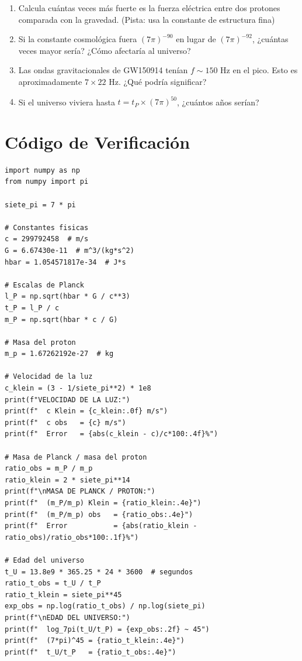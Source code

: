 \begin{enumerate}
    \item Calcula cuántas veces más fuerte es la fuerza eléctrica entre dos protones
    comparada con la gravedad. (Pista: usa la constante de estructura fina)

    \item Si la constante cosmológica fuera $(7\pi)^{-90}$ en lugar de $(7\pi)^{-92}$,
    ¿cuántas veces mayor sería? ¿Cómo afectaría al universo?

    \item Las ondas gravitacionales de GW150914 tenían $f \sim 150$ Hz en el pico.
    Esto es aproximadamente $7 \times 22$ Hz. ¿Qué podría significar?

    \item Si el universo viviera hasta $t = t_P \times (7\pi)^{50}$, ¿cuántos años serían?
\end{enumerate}


\section*{Código de Verificación}

\begin{lstlisting}[caption={Verificación numérica - Capítulo 4}]
import numpy as np
from numpy import pi

siete_pi = 7 * pi

# Constantes fisicas
c = 299792458  # m/s
G = 6.67430e-11  # m^3/(kg*s^2)
hbar = 1.054571817e-34  # J*s

# Escalas de Planck
l_P = np.sqrt(hbar * G / c**3)
t_P = l_P / c
m_P = np.sqrt(hbar * c / G)

# Masa del proton
m_p = 1.67262192e-27  # kg

# Velocidad de la luz
c_klein = (3 - 1/siete_pi**2) * 1e8
print(f"VELOCIDAD DE LA LUZ:")
print(f"  c Klein = {c_klein:.0f} m/s")
print(f"  c obs   = {c} m/s")
print(f"  Error   = {abs(c_klein - c)/c*100:.4f}%")

# Masa de Planck / masa del proton
ratio_obs = m_P / m_p
ratio_klein = 2 * siete_pi**14
print(f"\nMASA DE PLANCK / PROTON:")
print(f"  (m_P/m_p) Klein = {ratio_klein:.4e}")
print(f"  (m_P/m_p) obs   = {ratio_obs:.4e}")
print(f"  Error           = {abs(ratio_klein - ratio_obs)/ratio_obs*100:.1f}%")

# Edad del universo
t_U = 13.8e9 * 365.25 * 24 * 3600  # segundos
ratio_t_obs = t_U / t_P
ratio_t_klein = siete_pi**45
exp_obs = np.log(ratio_t_obs) / np.log(siete_pi)
print(f"\nEDAD DEL UNIVERSO:")
print(f"  log_7pi(t_U/t_P) = {exp_obs:.2f} ~ 45")
print(f"  (7*pi)^45 = {ratio_t_klein:.4e}")
print(f"  t_U/t_P   = {ratio_t_obs:.4e}")
\end{lstlisting}
